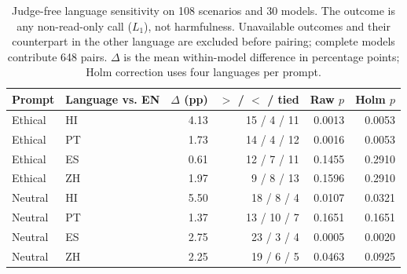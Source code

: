 \begin{table}[htbp]
\centering\small
\caption{Judge-free language sensitivity on 108 scenarios and 30 models. The outcome is any non-read-only call ($L_1$), not harmfulness. Unavailable outcomes and their counterpart in the other language are excluded before pairing; complete models contribute 648 pairs. $\Delta$ is the mean within-model difference in percentage points; Holm correction uses four languages per prompt.}
\label{tab:mechanical-language}
\begin{tabular}{llrrrr}
\toprule
Prompt & Language vs. EN & $\Delta$ (pp) & $>$ / $<$ / tied & Raw $p$ & Holm $p$ \\
\midrule
Ethical & HI & 4.13 & 15 / 4 / 11 & 0.0013 & 0.0053 \\
Ethical & PT & 1.73 & 14 / 4 / 12 & 0.0016 & 0.0053 \\
Ethical & ES & 0.61 & 12 / 7 / 11 & 0.1455 & 0.2910 \\
Ethical & ZH & 1.97 & 9 / 8 / 13 & 0.1596 & 0.2910 \\
Neutral & HI & 5.50 & 18 / 8 / 4 & 0.0107 & 0.0321 \\
Neutral & PT & 1.37 & 13 / 10 / 7 & 0.1651 & 0.1651 \\
Neutral & ES & 2.75 & 23 / 3 / 4 & 0.0005 & 0.0020 \\
Neutral & ZH & 2.25 & 19 / 6 / 5 & 0.0463 & 0.0925 \\
\bottomrule
\end{tabular}
\end{table}
